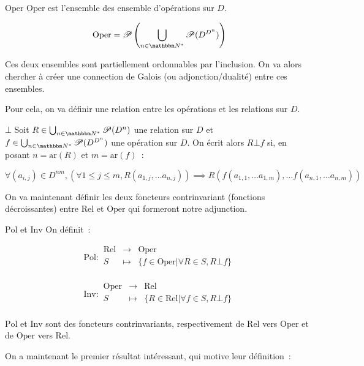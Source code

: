 \documentclass[12pt]{article}
\newcommand\Rel{\text{Rel}}
\newcommand\Oper{\text{Oper}}
\newcommand\Inv{\text{Inv}}
\newcommand\Pol{\text{Pol}}
\renewcommand\P{\mathscr{P}}
\newcommand\ar{\text{ar}}
\begin{document}
\begin{defi}{$\Oper$}
    $\Oper$ est l'ensemble des ensemble d'opérations sur $D$.

    \[\Oper = \P\left(\bigcup_{n\in\N^*} \P(D^{D^n})\right)\]
\end{defi}

Ces deux ensembles sont partiellement ordonnables par l'inclusion. On va alors
chercher à créer une connection de Galois (ou adjonction/dualité) entre ces
ensembles.

Pour cela, on va définir une relation entre les opérations et les relations sur $D$.

\begin{defi}{$\bot$} Soit $R\in \bigcup_{n\in\N^*} \P(D^n)$ une relation sur $D$
    et $f\in\bigcup_{n\in\N^*} \P(D^{D^n})$ une opération sur $D$. On écrit alors
    $R\bot f$ si, en posant $n = \ar(R)$ et $m = \ar(f)$~:

    \[ \forall (a_{i,j})\in D^{nm}, (\forall 1\leq j\leq m, R(a_{1,j}, \dots a_{n, j}))
         \implies R(f(a_{1,1}, \dots a_{1,m}), \dots f(a_{n,1}, \dots a_{n,m})) \]
\end{defi}

On va maintenant définir les deux foncteurs contrinvariant (fonctions décroissantes)
entre $\Rel$ et $\Oper$ qui formeront notre adjunction.

\begin{defi}{$\Pol$ et $\Inv$}
    On définit~:

    \[\Pol:\begin{array}{rcl}\Rel & \rightarrow & \Oper \\
        S & \mapsto & \{f\in\Oper | \forall R\in S, R\bot f\} \\
    \end{array}\]

    \[\Inv:\begin{array}{rcl}\Oper & \rightarrow & \Rel \\
        S & \mapsto & \{R\in\Rel | \forall f\in S, R\bot f\} \\
    \end{array}\]
\end{defi}

\begin{lem}
    $\Pol$ et $\Inv$ sont des foncteurs contrinvariants, respectivement de $\Rel$ vers
    $\Oper$ et de $\Oper$ vers $\Rel$.
\end{lem}

On a maintenant le premier résultat intéressant, qui motive leur définition~:
\end{document}
